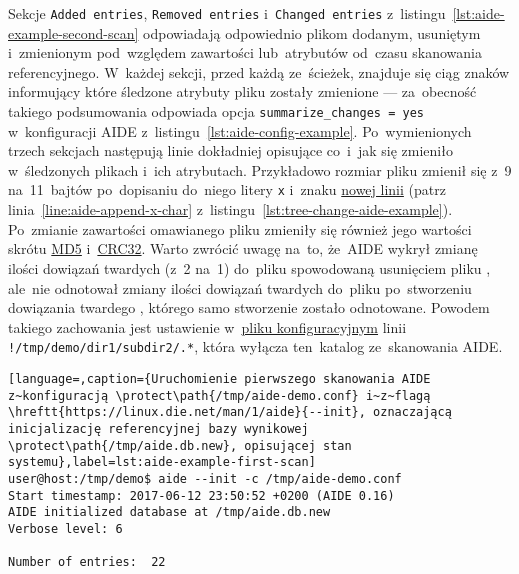 \documentclass[thesis]{subfiles}
\begin{document}
\begin{appendices}
	Sekcje \texttt{Added entries}, \texttt{Removed entries} i~\texttt{Changed entries} z~listingu~\ref{lst:aide-example-second-scan} odpowiadają odpowiednio plikom dodanym, usuniętym i~zmienionym pod~względem zawartości lub~atrybutów od~czasu skanowania referencyjnego. W~każdej sekcji, przed każdą ze~ścieżek, znajduje się ciąg znaków informujący które śledzone atrybuty pliku zostały zmienione --- za~obecność takiego podsumowania odpowiada opcja \texttt{summarize\_changes = yes} w~konfiguracji AIDE z~listingu~\ref{lst:aide-config-example}. Po~wymienionych trzech sekcjach następują linie dokładniej opisujące co~i~jak się zmieniło w~śledzonych plikach i~ich atrybutach. Przykładowo rozmiar pliku  zmienił się z~9 na~11~bajtów po~dopisaniu do~niego litery \texttt{x} i~znaku \href{https://superuser.com/questions/395668/how-do-i-echo-something-file-txt-without-carriage-return}{nowej linii} (patrz linia~\ref{line:aide-append-x-char} z~listingu~\ref{lst:tree-change-aide-example}). Po~zmianie zawartości omawianego pliku zmieniły się również jego wartości skrótu \href{https://en.wikipedia.org/wiki/MD5}{MD5} i~\href{https://en.wikipedia.org/wiki/Cyclic_redundancy_check}{CRC32}. Warto zwrócić uwagę na~to, że~AIDE wykrył zmianę ilości dowiązań twardych (z~2 na~1) do~pliku  spowodowaną usunięciem pliku , ale~nie odnotował zmiany ilości dowiązań twardych do~pliku  po~stworzeniu dowiązania twardego , którego samo stworzenie zostało odnotowane. Powodem takiego zachowania jest ustawienie w~\hyperref[lst:aide-config-example]{pliku konfiguracyjnym} linii \texttt{!/tmp/demo/dir1/subdir2/.*}, która wyłącza ten~katalog ze~skanowania AIDE.

\begin{minipage}{\linewidth}
\begin{lstlisting}[language=,caption={Uruchomienie pierwszego skanowania AIDE z~konfiguracją \protect\path{/tmp/aide-demo.conf} i~z~flagą \hreftt{https://linux.die.net/man/1/aide}{--init}, oznaczającą inicjalizację referencyjnej bazy wynikowej \protect\path{/tmp/aide.db.new}, opisującej stan systemu},label=lst:aide-example-first-scan]
user@host:/tmp/demo$ aide --init -c /tmp/aide-demo.conf
Start timestamp: 2017-06-12 23:50:52 +0200 (AIDE 0.16)
AIDE initialized database at /tmp/aide.db.new
Verbose level: 6

Number of entries:	22


\end{lstlisting}
\end{minipage}
\end{appendices}
\end{document}
